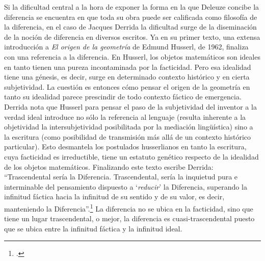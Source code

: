 Si la dificultad central a la hora de exponer la forma en la que Deleuze concibe la diferencia se encuentra en que toda su obra puede ser calificada como filosofía de la diferencia, en el caso de Jacques Derrida la dificultad surge de la diseminación de la noción de diferencia en diversos escritos. Ya en su primer texto, una extensa introducción a \emph{El origen de la geometría} de Edmund Husserl, de 1962, finaliza con una referencia a la diferencia. En Husserl, los objetos matemáticos son ideales en tanto tienen una pureza incontaminada por la facticidad. Pero esa idealidad tiene una génesis, es decir, surge en determinado contexto histórico y en cierta subjetividad. La cuestión es entonces cómo pensar el origen de la geometría en tanto su idealidad parece prescindir de todo contexto fáctico de emergencia. Derrida nota que Husserl para pensar el paso de la subjetividad del inventor a la verdad ideal introduce no sólo la referencia al lenguaje (resulta inherente a la objetividad la intersubjetividad posibilitada por la mediación lingüística) sino a la escritura (como posibilidad de transmisión más allá de un contexto histórico particular). Esto desmantela los postulados husserlianos en tanto la escritura, cuya facticidad es irreductible, tiene un estatuto genético respecto de la idealidad de los objetos matemáticos. Finalizando este texto escribe Derrida: \enquote{Trascendental sería la Diferencia. Trascendental, sería la inquietud pura e interminable del pensamiento dispuesto a \enquote{\emph{reducir}} la Diferencia, superando la infinitud fáctica hacia la infinitud de su sentido y de su valor, es decir, manteniendo la Diferencia}.\footcite[162]{@6978-DERRIDA2000} La diferencia no se ubica en la facticidad, sino que tiene un lugar trascendental, o mejor, la diferencia es cuasi-trascendental puesto que se ubica entre la infinitud fáctica y la infinitud ideal.

